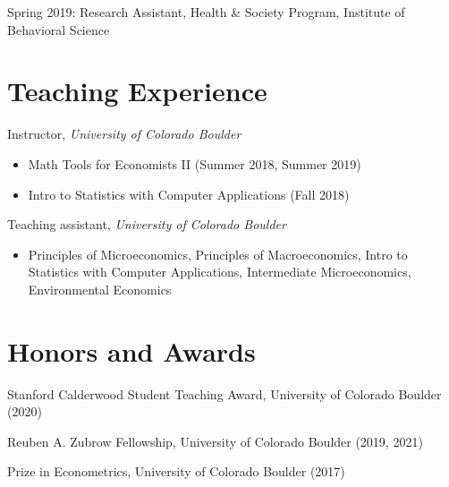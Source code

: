 \documentclass[letterpaper]{article}
\begin{document}
Spring 2019: Research Assistant, Health \& Society Program, Institute of Behavioral Science

\section*{Teaching Experience}
	Instructor, \textit{University of Colorado Boulder}
  \begin{itemize}[topsep=2pt,itemsep=-1pt,leftmargin=1em]
    \item[] Math Tools for Economists II (Summer 2018, Summer 2019)
    \item[] Intro to Statistics with Computer Applications (Fall 2018)
  \end{itemize}
  \vspace*{.5em}
	Teaching assistant, \textit{University of Colorado Boulder}
	\begin{itemize}[topsep=2pt,itemsep=-1pt,leftmargin=1em]
    \item[] Principles of Microeconomics, Principles of Macroeconomics, Intro to Statistics with Computer Applications, Intermediate Microeconomics, Environmental Economics
  \end{itemize}
\section*{Honors and Awards}
	Stanford Calderwood Student Teaching Award, University of Colorado Boulder (2020)

	Reuben A. Zubrow Fellowship, University of Colorado Boulder (2019, 2021)

	Prize in Econometrics, University of Colorado Boulder (2017)
\end{document}
